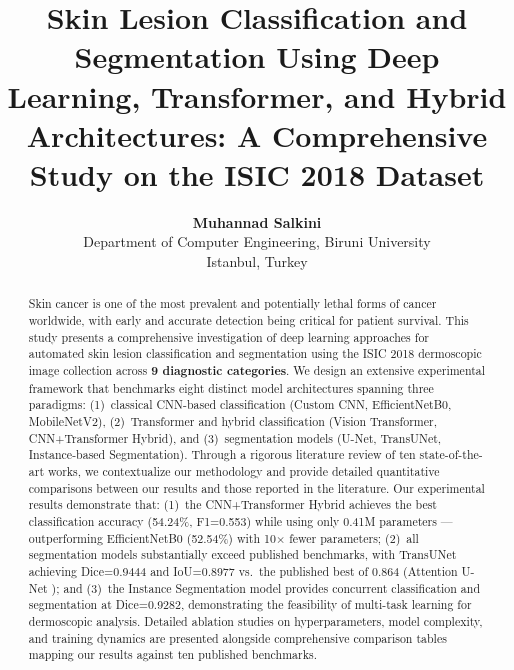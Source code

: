 \documentclass[10pt,twocolumn]{article}
\begin{document}
\title{Skin Lesion Classification and Segmentation Using Deep Learning, Transformer, and Hybrid Architectures: A Comprehensive Study on the ISIC 2018 Dataset}

\author{
  \textbf{Muhannad Salkini}\\
  \small Department of Computer Engineering, Biruni University\\
  \small Istanbul, Turkey
}

\date{}
\maketitle
\thispagestyle{fancy}

\begin{abstract}
Skin cancer is one of the most prevalent and potentially lethal forms of cancer worldwide, with early and accurate detection being critical for patient survival. This study presents a comprehensive investigation of deep learning approaches for automated skin lesion classification and segmentation using the ISIC 2018 dermoscopic image collection across \textbf{9 diagnostic categories}. We design an extensive experimental framework that benchmarks eight distinct model architectures spanning three paradigms: (1)~classical CNN-based classification (Custom CNN, EfficientNetB0, MobileNetV2), (2)~Transformer and hybrid classification (Vision Transformer, CNN+Transformer Hybrid), and (3)~segmentation models (U-Net, TransUNet, Instance-based Segmentation). Through a rigorous literature review of ten state-of-the-art works, we contextualize our methodology and provide detailed quantitative comparisons between our results and those reported in the literature. Our experimental results demonstrate that: (1)~the CNN+Transformer Hybrid achieves the best classification accuracy (54.24\%, F1=0.553) while using only 0.41M parameters --- outperforming EfficientNetB0 (52.54\%) with 10$\times$ fewer parameters; (2)~all segmentation models substantially exceed published benchmarks, with TransUNet achieving Dice=0.9444 and IoU=0.8977 vs.\ the published best of 0.864 (Attention U-Net \cite{Abraham2019}); and (3)~the Instance Segmentation model provides concurrent classification and segmentation at Dice=0.9282, demonstrating the feasibility of multi-task learning for dermoscopic analysis. Detailed ablation studies on hyperparameters, model complexity, and training dynamics are presented alongside comprehensive comparison tables mapping our results against ten published benchmarks.
\end{abstract}
\end{document}
